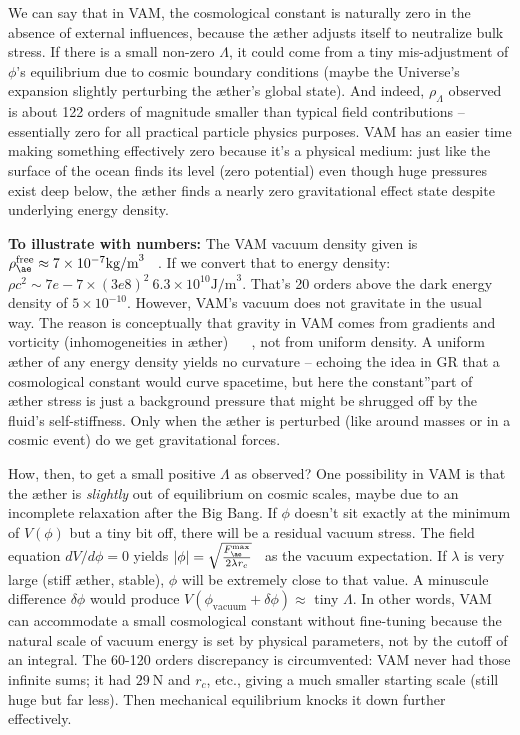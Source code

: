 \documentclass[a4paper, aps,preprint,superscriptaddress, 12pt]{revtex4}
\begin{document}
We can say that in VAM, the cosmological constant is naturally zero in the absence of external influences, because the æther adjusts itself to neutralize bulk stress. If there is a small non-zero $\Lambda$, it could come from a tiny mis-adjustment of $\phi$'s equilibrium due to cosmic boundary conditions (maybe the Universe's expansion slightly perturbing the æther's global state). And indeed, $\rho_\Lambda$ observed is about 122 orders of magnitude smaller than typical field contributions – essentially zero for all practical particle physics purposes. VAM has an easier time making something effectively zero because it's a physical medium: just like the surface of the ocean finds its level (zero potential) even though huge pressures exist deep below, the æther finds a nearly zero gravitational effect state despite underlying energy density.


\textbf{To illustrate with numbers:} The VAM vacuum density given is $\rho_{\ae}^{\text{free}}\approx7\times10^{-7}\text{kg/m}^3$~\cite{VAM_constants} . If we convert that to energy density: $\rho c^2 \sim 7e-7 \times (3e8)^2 ~ 6.3\times10^{10}\text{J/m}^3$.
That's 20 orders above the dark energy density of $5\times10^{-10}$. However, VAM's vacuum does not gravitate in the usual way. The reason is conceptually that gravity in VAM comes from gradients and vorticity (inhomogeneities in æther)~\cite{Iskandarani2025c} ~\cite{Iskandarani2025c} , not from uniform density. A uniform æther of any energy density yields no curvature – echoing the idea in GR that a cosmological constant would curve spacetime, but here the \grqq constant\textquotedblright part of æther stress is just a background pressure that might be shrugged off by the fluid's self-stiffness. Only when the æther is perturbed (like around masses or in a cosmic event) do we get gravitational forces.


How, then, to get a small positive $\Lambda$ as observed? One possibility in VAM is that the æther is \textit{slightly} out of equilibrium on cosmic scales, maybe due to an incomplete relaxation after the Big Bang. If $\phi$ doesn't sit exactly at the minimum of $V(\phi)$ but a tiny bit off, there will be a residual vacuum stress. The field equation $dV/d\phi = 0$ yields $|\phi| = \sqrt{\frac{F_{\ae}^{\max}}{2\lambda r_c}}$~\cite{Iskandarani2025c}  as the vacuum expectation. If $\lambda$ is very large (stiff æther, stable), $\phi$ will be extremely close to that value. A minuscule difference $\delta\phi$ would produce $V(\phi_{\text{vacuum}}+\delta\phi) \approx$ tiny $\Lambda$. In other words, VAM can accommodate a small cosmological constant without fine-tuning because the natural scale of vacuum energy is set by physical parameters, not by the cutoff of an integral. The 60-120 orders discrepancy is circumvented: VAM never had those infinite sums; it had $29~\text{N}$ and $r_c$, etc., giving a much smaller starting scale (still huge but far less). Then mechanical equilibrium knocks it down further effectively.
\end{document}
